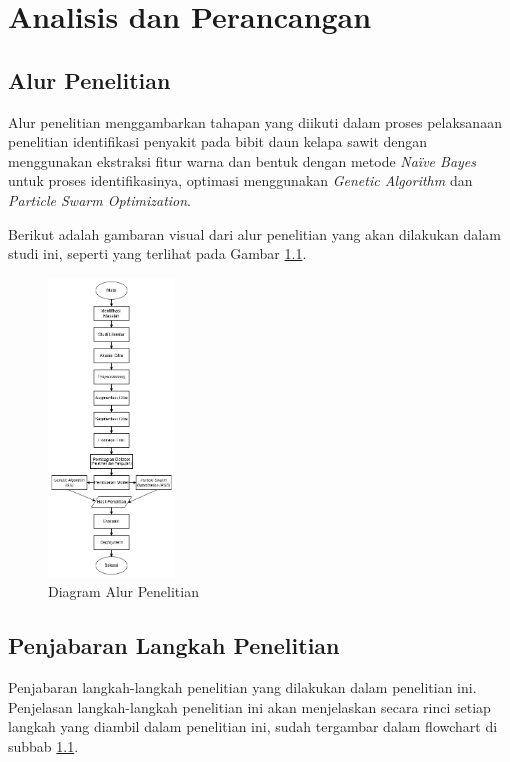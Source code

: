 \newpage
\chapter{Analisis dan Perancangan} \label{Bab III}

\section{Alur Penelitian} \label{III.Alur}
Alur penelitian menggambarkan tahapan yang diikuti dalam proses pelaksanaan penelitian identifikasi penyakit pada bibit daun kelapa sawit dengan menggunakan ekstraksi fitur warna dan bentuk dengan metode \textit{Naïve Bayes} untuk proses identifikasinya, optimasi menggunakan \textit{Genetic Algorithm} dan \textit{Particle Swarm Optimization}.

Berikut adalah gambaran visual dari alur penelitian yang akan dilakukan dalam studi ini, seperti yang terlihat pada Gambar \ref{fig:2.Diagram Alur Penelitian}. \par
\begin{figure}[H]
	\centering
	\includegraphics[width=0.3\textwidth]{figure/chapter-3-alur-penelitian.png}
	\caption{Diagram Alur Penelitian}
	\label{fig:2.Diagram Alur Penelitian}
\end{figure}

\section{Penjabaran Langkah Penelitian} \label{III.Jabar Alur}
Penjabaran langkah-langkah penelitian yang dilakukan dalam penelitian ini. Penjelasan langkah-langkah penelitian ini akan menjelaskan secara rinci setiap langkah yang diambil dalam penelitian ini, sudah tergambar dalam flowchart di subbab \ref{III.Alur}.\par


